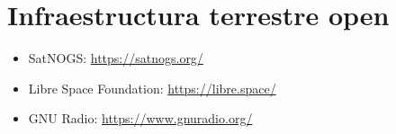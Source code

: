 \documentclass[11pt,a4paper,oneside,openright]{book}
\begin{document}
\section{Infraestructura terrestre open}

\begin{itemize}[leftmargin=2em]
  \item SatNOGS: \url{https://satnogs.org/}
  \item Libre Space Foundation: \url{https://libre.space/}
  \item GNU Radio: \url{https://www.gnuradio.org/}
\end{itemize}
\end{document}
